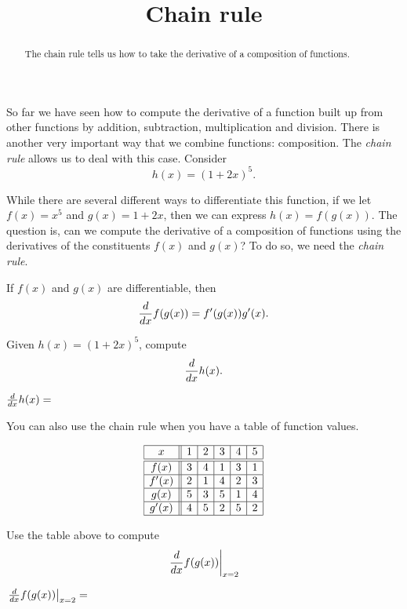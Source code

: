 \documentclass{ximera}
\title{Chain rule}
\begin{document}
\begin{abstract}
  The chain rule tells us how to take the derivative of a composition
  of functions.
\end{abstract}
\maketitle


So far we have seen how to compute the derivative of a function built
up from other functions by addition, subtraction, multiplication and
division. There is another very important way that we combine
functions: composition. The \textit{chain rule} allows us to deal with
this case. Consider
\[
h(x) = (1+2x)^5.
\] 

While there are several different ways to differentiate this function,
if we let $f(x) = x^5$ and $g(x) = 1+2x$, then we can express $h(x) =
f(g(x))$. The question is, can we compute the derivative of a
composition of functions using the derivatives of the constituents
$f(x)$ and $g(x)$? To do so, we need the \textit{chain rule}.

\begin{theorem}
If $f(x)$ and $g(x)$ are differentiable, then
\[
\frac{d}{dx} f(g(x)) = f'(g(x))g'(x).
\]
\end{theorem}

\begin{question}
  Given $h(x) = (1+2x)^5$, compute
\[
\frac{d}{dx} h(x).
\]
\begin{prompt}
$\frac{d}{dx} h(x) = $
\end{prompt}
\end{question}

You can also use the chain rule when you have a table of function
values.


\[
\begin{array}{|c||c|c|c|c|c|}
\hline
 x    & 1 & 2 & 3 & 4 & 5 \\ \hline \hline 
f(x)  & 3 & 4 & 1 & 3 & 1 \\ \hline
f'(x) & 2 & 1 & 4 & 2 & 3 \\ \hline
g(x)  & 5 & 3 & 5 & 1 & 4 \\ \hline
g'(x) & 4 & 5 & 2 & 5 & 2 \\ \hline
\end{array}
\]


\begin{question}
Use the table above to compute
\[
\left.\frac{d}{dx} f(g(x))\right|_{x=2}
\]
\begin{prompt}
$\left.\frac{d}{dx} f(g(x))\right|_{x=2}=$
\end{prompt}
\end{question}
\end{document}

